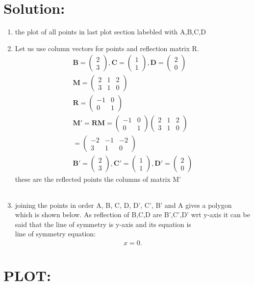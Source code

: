 \documentclass[journal,12pt,twocolumn]{IEEEtran}
\newcommand{\myvec}[1]{\ensuremath{\begin{pmatrix}#1\end{pmatrix}}}
\let\vec\mathbf
\begin{document}
	\section{Solution:}
	\begin{enumerate}[label=(1.\arabic*)]
		\item the plot of all points in last plot section labebled with  A,B,C,D\\
		\item Let us use column vectors for points and reflection matrix R.\\
		\begin{align*}
		\vec{B}=\myvec{2\\3}  ,
		\vec{C}=\myvec{1\\1}  ,
	    \vec{D}=\myvec{2\\0}
		 \\
	    \vec{M}=\myvec{2&1&2\\3&1&0}
	    \\
		\vec{R}=\myvec{-1& 0\\ 0 & 1}
		\\
		\vec{M'}=\vec{RM}=\myvec{-1& 0\\ 0 & 1}\myvec{2&1&2\\3&1&0}
		\\
		  =\myvec{-2&-1&-2\\3&1&0}
		  \\   
		  	\vec{B'}=\myvec{2\\3} , 
		  	\vec{C'}=\myvec{1\\1} ,  
		  	\vec{D'}=\myvec{2\\0}
		 \end{align*}
	 these are the reflected points the columns of matrix M'\\\\
		\item joining the points in order  A, B, C, D, D', C', B' and A gives a polygon which is shown below.
		 As reflection of B,C,D are B',C',D' wrt y-axis it can be said that the line of symmetry is y-axis and its equation is \\
		line of symmetry equation:
		\begin{align*}
			\label{line of symmetry equation}
			x=0.
		\end{align*}
		
	\end{enumerate}      
	\section{PLOT:}
	
\end{document}
